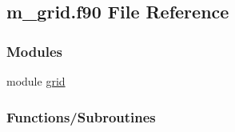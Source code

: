 \hypertarget{m__grid_8f90}{}\subsection{m\+\_\+grid.\+f90 File Reference}
\label{m__grid_8f90}
\subsubsection*{Modules}
\begin{DoxyCompactItemize}
\item 
module \hyperlink{namespacegrid}{grid}
\end{DoxyCompactItemize}
\subsubsection*{Functions/\+Subroutines}

